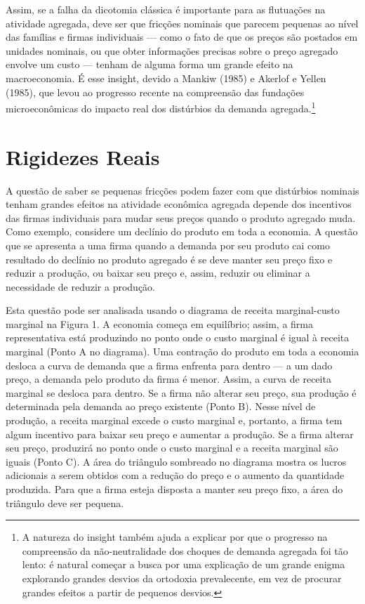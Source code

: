 \documentclass[12pt]{article}
\begin{document}
Assim, se a falha da dicotomia clássica é importante para as flutuações na atividade agregada, deve ser que fricções nominais que parecem pequenas ao nível das famílias e firmas individuais — como o fato de que os preços são postados em unidades nominais, ou que obter informações precisas sobre o preço agregado envolve um custo — tenham de alguma forma um grande efeito na macroeconomia. É esse insight, devido a Mankiw (1985) e Akerlof e Yellen (1985), que levou ao progresso recente na compreensão das fundações microeconômicas do impacto real dos distúrbios da demanda agregada.\footnote{A natureza do insight também ajuda a explicar por que o progresso na compreensão da não-neutralidade dos choques de demanda agregada foi tão lento: é natural começar a busca por uma explicação de um grande enigma explorando grandes desvios da ortodoxia prevalecente, em vez de procurar grandes efeitos a partir de pequenos desvios.}

\section*{Rigidezes Reais}

A questão de saber se pequenas fricções podem fazer com que distúrbios nominais tenham grandes efeitos na atividade econômica agregada depende dos incentivos das firmas individuais para mudar seus preços quando o produto agregado muda. Como exemplo, considere um declínio do produto em toda a economia. A questão que se apresenta a uma firma quando a demanda por seu produto cai como resultado do declínio no produto agregado é se deve manter seu preço fixo e reduzir a produção, ou baixar seu preço e, assim, reduzir ou eliminar a necessidade de reduzir a produção.

Esta questão pode ser analisada usando o diagrama de receita marginal-custo marginal na Figura 1. A economia começa em equilíbrio; assim, a firma representativa está produzindo no ponto onde o custo marginal é igual à receita marginal (Ponto A no diagrama). Uma contração do produto em toda a economia desloca a curva de demanda que a firma enfrenta para dentro — a um dado preço, a demanda pelo produto da firma é menor. Assim, a curva de receita marginal se desloca para dentro. Se a firma não alterar seu preço, sua produção é determinada pela demanda ao preço existente (Ponto B). Nesse nível de produção, a receita marginal excede o custo marginal e, portanto, a firma tem algum incentivo para baixar seu preço e aumentar a produção. Se a firma alterar seu preço, produzirá no ponto onde o custo marginal e a receita marginal são iguais (Ponto C). A área do triângulo sombreado no diagrama mostra os lucros adicionais a serem obtidos com a redução do preço e o aumento da quantidade produzida. Para que a firma esteja disposta a manter seu preço fixo, a área do triângulo deve ser pequena.
\end{document}
